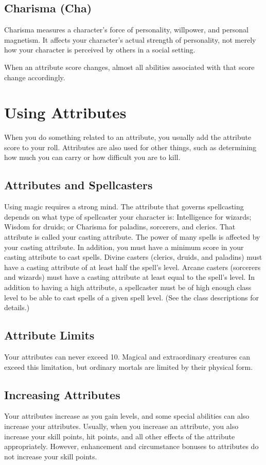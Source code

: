 \subsection{Charisma (Cha)}
Charisma measures a character's force of personality, willpower, and personal magnetism. It affects your character's actual strength of personality, not merely how your character is perceived by others in a social setting.

When an attribute score changes, almost all abilities associated with that score change accordingly.

\section{Using Attributes}
When you do something related to an attribute, you usually add the attribute score to your roll. Attributes are also used for other things, such as determining how much you can carry or how difficult you are to kill. 

\subsection{Attributes and Spellcasters}
Using magic requires a strong mind. The attribute that governs spellcasting depends on what type of spellcaster your character is: Intelligence for wizards; Wisdom for druids; or Charisma for paladins, sorcerers, and clerics. That attribute is called your casting attribute. The power of many spells is affected by your casting attribute. In addition, you must have a minimum score in your casting attribute to cast spells. Divine casters (clerics, druids, and paladins) must have a casting attribute of at least half the spell's level. Arcane casters (sorcerers and wizards) must have a casting attribute at least equal to the spell's level. In addition to having a high attribute, a spellcaster must be of high enough class level to be able to cast spells of a given spell level. (See the class descriptions for details.)

\subsection{Attribute Limits}
Your attributes can never exceed 10. Magical and extraordinary creatures can exceed this limitation, but ordinary mortals are limited by their physical form.

\subsection{Increasing Attributes}
Your attributes increase as you gain levels, and some special abilities can also increase your attributes. Usually, when you increase an attribute, you also increase your skill points, hit points, and all other effects of the attribute appropriately. However, enhancement and circumstance bonuses to attributes do not increase your skill points.

